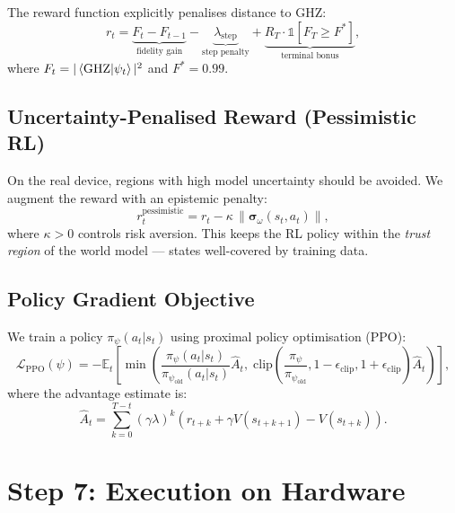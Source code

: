 \documentclass[11pt,a4paper]{article}
\begin{document}
The reward function explicitly penalises distance to GHZ:
\begin{equation}
    r_t = \underbrace{F_t - F_{t-1}}_{\text{fidelity gain}}
    - \underbrace{\lambda_{\mathrm{step}}}_{\text{step penalty}}
    + \underbrace{R_T \cdot \mathbb{1}[F_T \geq F^*]}_{\text{terminal bonus}},
\end{equation}
where $F_t = |\braket{\mathrm{GHZ}}{\psi_t}|^2$ and $F^* = 0.99$.

\subsection{Uncertainty-Penalised Reward (Pessimistic RL)}

On the real device, regions with high model uncertainty should be avoided.
We augment the reward with an epistemic penalty:
\begin{equation}
    r_t^{\mathrm{pessimistic}} = r_t - \kappa\, \|\boldsymbol{\sigma}_\omega(s_t, a_t)\|,
\end{equation}
where $\kappa > 0$ controls risk aversion. This keeps the RL policy within the
\emph{trust region} of the world model — states well-covered by training data.

\subsection{Policy Gradient Objective}

We train a policy $\pi_\psi(a_t | s_t)$ using proximal policy optimisation (PPO):
\begin{equation}
    \mathcal{L}_{\mathrm{PPO}}(\psi) =
    -\mathbb{E}_{t}\!\left[\min\!\left(
    \frac{\pi_\psi(a_t|s_t)}{\pi_{\psi_{\mathrm{old}}}(a_t|s_t)} \hat{A}_t,\;
    \mathrm{clip}\!\left(\frac{\pi_\psi}{\pi_{\psi_{\mathrm{old}}}},
    1-\epsilon_{\mathrm{clip}}, 1+\epsilon_{\mathrm{clip}}\right) \hat{A}_t
    \right)\right],
\end{equation}
where the advantage estimate is:
\begin{equation}
    \hat{A}_t = \sum_{k=0}^{T-t} (\gamma\lambda)^k
    \left(r_{t+k} + \gamma V(s_{t+k+1}) - V(s_{t+k})\right).
\end{equation}

\section{Step 7: Execution on Hardware}\label{sec:hardware}
\end{document}
